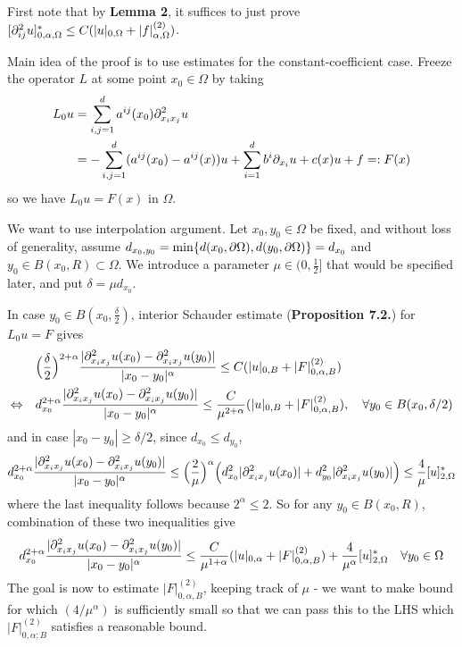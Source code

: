 \documentclass[12pt,a4paper]{article}
\newenvironment{proof}
{\begin{changemargin}{1cm}{0.5cm} 
	}%
	{\end{changemargin}
}
\newenvironment{p}
{\begin{proof} 
	}%
	{\end{proof}
}
\begin{document}
\begin{p}
\pf First note that by \textbf{Lemma 2}, it suffices to just prove $[\partial^2_{ij} u]^*_{0, \alpha, \Omega} \leq C(|u|_{0, \Omega} + |f|^{(2)}_{\alpha, \Omega})$.

\quad Main idea of the proof is to use estimates for the constant-coefficient case. Freeze the operator $L$ at some point $x_0 \in \Omega$ by taking
\begin{align*}
L_0 u &= \sum_{i,j=1}^d a^{ij}(x_0) \partial^2_{x_i x_j}u \\
&= -\sum_{i,j =1}^d (a^{ij}(x_0)-a^{ij}(x)) u +\sum_{i=1}^d b^i \partial_{x_i} u + c(x) u +f =: F(x)
\end{align*}
so we have $L_0 u = F(x)$ in $\Omega$.
\s

We want to use interpolation argument. Let $x_0, y_0 \in \Omega$ be fixed, and without loss of generality, assume $d_{x_0, y_0} = \min \{d(x_0, \partial \Omega),d(y_0, \partial \Omega)\} = d_{x_0}$ and $y_0 \in B(x_0,R) \subset \Omega$. We introduce a parameter $\mu \in (0, \frac{1}{2}]$ that would be specified later, and put $\delta = \mu d_{x_0}$.

\quad In case $y_0 \in B(x_0, \frac{\delta}{2})$, interior Schauder estimate (\textbf{Proposition 7.2.}) for $L_0 u =F$ gives
\begin{align*}
& \Big( \frac{\delta}{2} \Big)^{2+\alpha}\frac{|\partial^2_{x_i x_j} u(x_0) - \partial^2_{x_i x_j} u(y_0)|}{|x_0 - y_0|^{\alpha}} \leq C(|u|_{0, B} + |F|^{(2)}_{0, \alpha, B}) \\
\Leftrightarrow \quad & d^{2+ \alpha}_{x_0}\frac{|\partial^2_{x_i x_j} u(x_0) - \partial^2_{x_i x_j} u(y_0)|}{|x_0 - y_0|^{\alpha}} \leq \frac{C}{\mu^{2+ \alpha}} (|u|_{0, B} + |F|^{(2)}_{0, \alpha, B}), \quad \forall y_0 \in B(x_0, \delta/2)
\end{align*}
and in case $|x_0 -y_0| \geq \delta/2$, since $d_{x_0} \leq d_{y_0}$, 
\begin{align*}
d_{x_0}^{2+\alpha} \frac{|\partial^2_{x_i x_j} u(x_0) - \partial^2_{x_i x_j} u(y_0)|}{|x_0 - y_0|^{\alpha}} \leq \Big(\frac{2}{\mu} \Big)^{\alpha} \Big( d_{x_0}^2 |\partial^2_{x_i x_j} u(x_0)| + d^2_{y_0} |\partial^2_{x_i x_j}u(y_0)| \Big) \leq \frac{4}{\mu} [u]^*_{2, \Omega}
\end{align*}
where the last inequality follows because $2^{\alpha}\leq 2$. So for any $y_0 \in B(x_0, R)$, combination of these two inequalities give
\begin{align*}
d^{2+ \alpha}_{x_0} \frac{|\partial^2_{x_i x_j} u(x_0) - \partial^2_{x_i x_j} u(y_0)|}{|x_0 - y_0|^{\alpha}} \leq \frac{C}{\mu^{1+ \alpha}} (|u|_{0, \alpha} + |F|^{(2)}_{0, \alpha, B}) + \frac{4}{\mu^{\alpha}} [u]^*_{2,\Omega} \quad \forall y_0 \in \Omega
\end{align*}
The goal is now to estimate $|F|^{(2)}_{0, \alpha, B}$, keeping track of $\mu$ - we want to make bound for which $(4/\mu^{\alpha})$ is sufficiently small so that we can pass this to the LHS which $|F|^{(2)}_{0, \alpha;B}$ satisfies a reasonable bound.
\s


\end{p}
\end{document}
